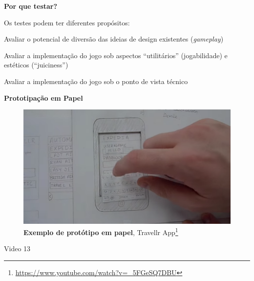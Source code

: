 \expandafter\documentclass\expandafter[table, usenames, svgnames, dvipsnames, \classopts]{beamer}
\begin{document}
\begin{frame}{\textbf{Por que testar?}}

	Os testes podem ter diferentes propósitos:

	\begin{outline}
		\1 Avaliar o potencial de diversão das ideias de design existentes (\textit{gameplay})
			
		\vspace{1em}
			
		\1 Avaliar a implementação do jogo sob aspectos ``utilitários'' (jogabilidade) e estéticos (``juiciness'')
		
		\vspace{1em}

		\1 Avaliar a implementação do jogo sob o ponto de vista técnico
		
	\end{outline}

\end{frame}

\begin{frame}{\textbf{Prototipação em Papel}}

	\begin{figure}
	    \centering
        \includegraphics[draft,width=0.8\paperwidth]{paper-prototype}
        \caption{\textbf{Exemplo de protótipo em papel}, Travellr App\footnote{\url{https://www.youtube.com/watch?v=_5FGeSQ7DBU}}}
    \end{figure}

    \begin{center}
    	Video 13
    \end{center}

    \vspace{2em}

\end{frame}
\end{document}
